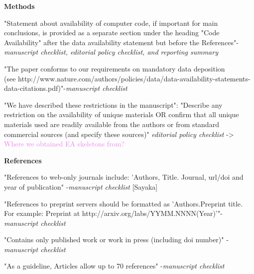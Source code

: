 \documentclass[11pt,letterpaper]{report}
\newcommand{\cmark}{\ding{51}}%
\newcommand{\done}{\rlap{$\square$}{\raisebox{2pt}{\large\hspace{1pt}\cmark}}%
\hspace{-2.5pt}}
\begin{document}

\textbf{Methods}
\begin{todolist}
\item[\done] "Statement about availability of computer code, if important for main conclusions, is provided as a separate section under the heading "Code Availability" after the data availability statement but before the References"-\textit{manuscript checklist, editorial policy checklist, and reporting summary}
\item [\done] "The paper conforms to our requirements on mandatory data deposition \\ (see http://www.nature.com/authors/policies/data/data-availability-statements-data-citations.pdf)"-\textit{manuscript checklist}
\item[\done] "We have described these restrictions in the manuscript": "Describe any restriction on the availability of unique materials OR confirm that all unique materials used are readily available from the authors or from standard commercial sources (and specify these sources)" \textit{editorial policy checklist} -> \textcolor{violet}{Where we obtained EA skeletons from?}
\end{todolist}

\textbf{References}
\begin{todolist}
\item[\done] "References to web-only journals include: 'Authors, Title. Journal, url/doi and year of publication" -\textit{manuscript checklist} \textcolor{BlueGreen}{[Sayaka]}
\item[\done] "References to preprint servers should be formatted as 'Authors.Preprint title. For example: Preprint at http://arxiv.org/labs/YYMM.NNNN(Year)'"-\textit{manuscript checklist}
\item[\done] "Contains only published work or work in press (including doi number)" -\textit{manuscript checklist}
\item[\done]"As a guideline, Articles allow up to 70 references" -\textit{manuscript checklist}
\end{todolist}
\end{document}
